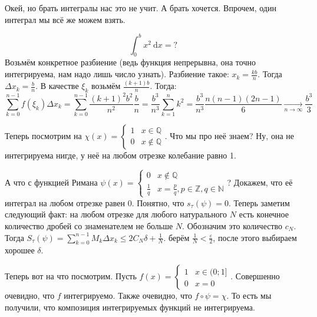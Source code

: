 \documentclass{article}
\begin{document}
\begin{itemize}
\begin{Proof}
        \end{Proof}
        \begin{Comment}
            Окей, но брать интегралы нас это не учит. А брать хочется. Впрочем, один интеграл мы всё же можем взять.
        \end{Comment}
        \begin{Example}
            $$\int_0^bx^2~\mathrm dx=?$$
            Возьмём конкретное разбиение (ведь функция непрерывна, она точно интегрируема, нам надо лишь число узнать). Разбиение такое: $x_k=\frac{kb}n$. Тогда $\Delta x_k=\frac bn$. В качестве $\xi_k$ возьмём $\frac{(k+1)b}n$. Тогда:
            $$\sum\limits_{k=0}^{n-1}f(\xi_k)\Delta x_k=\sum\limits_{k=0}^{n-1}\frac{(k+1)^2b^2}{n^2}\frac bn=\frac{b^3}{n^3}\sum\limits_{k=1}^{n}k^2=\frac{b^3}{n^3}\frac{n(n-1)(2n-1)}6\underset{n\to\infty}\longrightarrow\frac{b^3}3$$
        \end{Example}
        \begin{Example}
            Теперь посмотрим на $\chi(x)=\begin{cases}
                1 & x\in\mathbb Q\\
                0 & x\notin\mathbb Q
            \end{cases}$. Что мы про неё знаем? Ну, она не интегрируема нигде, у неё на любом отрезке колебание равно 1.
        \end{Example}
        \begin{Example}
            А что с функцией Римана $\psi(x)=\begin{cases}
                0 & x\notin\mathbb Q\\
                \frac1q & x=\frac pq,p\in\mathbb Z,q\in\mathbb N
            \end{cases}$? Докажем, что её интеграл на любом отрезке равен 0. Понятно, что $s_\tau(\psi)=0$. Теперь заметим следующий факт: на любом отрезке для любого натурального $N$ есть конечное количество дробей со знаменателем не больше $N$. Обозначим это количество $c_N$. Тогда $S_\tau(\psi)=\sum\limits_{k=0}^{n-1}M_k\Delta x_k\leqslant2C_N\delta+\frac1N$. берём $\frac1N<\frac\varepsilon2$, после этого выбираем хорошее $\delta$.
        \end{Example}
        \begin{Example}
            Теперь вот на что посмотрим. Пусть $f(x)=\begin{cases}
                1 & x\in(0;1]\\
                0 & x=0
            \end{cases}$. Совершенно очевидно, что $f$ интегрируемо. Также очевидно, что $f\circ\psi=\chi$. То есть мы получили, что композиция интегрируемых функций не интегрируема.

\end{Example}
\end{itemize}
\end{document}
